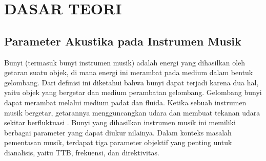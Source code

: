 \chapter{DASAR TEORI}\label{dasar-teori}


\section{Parameter Akustika pada Instrumen Musik}
Bunyi (termasuk bunyi instrumen musik) adalah energi yang dihasilkan oleh getaran suatu objek, di mana energi ini merambat pada medium dalam bentuk gelombang. Dari definisi ini diketahui bahwa bunyi dapat terjadi karena dua hal, yaitu objek yang bergetar dan medium perambatan gelombang. Gelombang bunyi dapat merambat melalui medium padat dan fluida. Ketika sebuah instrumen musik bergetar, getarannya mengguncangkan udara dan membuat tekanan udara sekitar berfluktuasi \cite{handbookAcoustic}. Bunyi yang dihasilkan instrumen musik ini memiliki berbagai parameter yang dapat diukur nilainya. Dalam konteks masalah pementasan musik, terdapat tiga parameter objektif yang penting untuk dianalisis, yaitu TTB, frekuensi, dan direktivitas. \par

